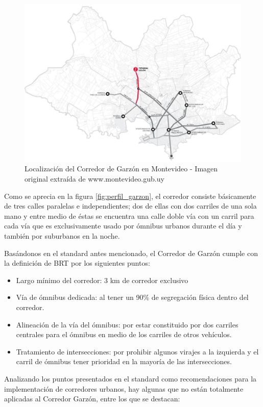 \begin{figure}[H]
	\centering
	\includegraphics[width=0.7\linewidth]{Figures/Mapa_Garzon_0}
	\caption{Localización del Corredor de Garzón en Montevideo - Imagen original extraída de www.montevideo.gub.uy		
	}
	\label{fig:Grafica de costos de otros medios de transporte}
\end{figure}

Como se aprecia en la figura \ref{fig:perfil_garzon}, el corredor consiste básicamente de tres calles paralelas e independientes; dos de ellas con dos carriles de una sola mano y entre medio de éstas se encuentra una calle doble vía con un carril para cada vía que es exclusivamente usado por ómnibus urbanos durante el día y también por suburbanos en la noche.


Basándonos en el standard antes mencionado, el Corredor de Garzón cumple con la definición de BRT por los siguientes puntos:
\begin{itemize}
	\item Largo mínimo del corredor: 3 km de corredor exclusivo 
	\item Vía de ómnibus dedicada: al tener un 90\% de segregación física dentro del corredor.
	\item Alineación de la vía del ómnibus: por estar constituido por dos carriles centrales para el ómnibus en medio de los carriles de otros vehículos.
	\item Tratamiento de intersecciones: por prohibir algunos virajes a la izquierda y el carril de ómnibus tener prioridad en la mayoría de las intersecciones.
\end{itemize}


Analizando los puntos presentados en el standard como recomendaciones para la implementación de corredores urbanos, hay algunas que no están totalmente aplicadas al Corredor Garzón, entre los que se destacan:

